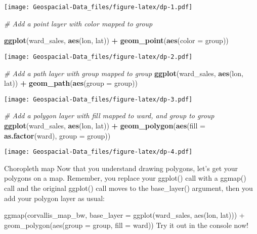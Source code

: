 \documentclass[]{article}
\newenvironment{Shaded}{\begin{snugshade}}{\end{snugshade}}
\newcommand{\CommentTok}[1]{\textcolor[rgb]{0.56,0.35,0.01}{\textit{#1}}}
\newcommand{\DataTypeTok}[1]{\textcolor[rgb]{0.13,0.29,0.53}{#1}}
\newcommand{\KeywordTok}[1]{\textcolor[rgb]{0.13,0.29,0.53}{\textbf{#1}}}
\newcommand{\NormalTok}[1]{#1}
\newcommand{\OperatorTok}[1]{\textcolor[rgb]{0.81,0.36,0.00}{\textbf{#1}}}
\begin{document}
\texttt{[image: Geospacial-Data\_files/figure-latex/dp-1.pdf]}

\begin{Shaded}
\begin{Highlighting}[]
\CommentTok{# Add a point layer with color mapped to group}

\KeywordTok{ggplot}\NormalTok{(ward_sales, }\KeywordTok{aes}\NormalTok{(lon, lat)) }\OperatorTok{+}
\KeywordTok{geom_point}\NormalTok{(}\KeywordTok{aes}\NormalTok{(}\DataTypeTok{color =}\NormalTok{ group))}
\end{Highlighting}
\end{Shaded}

\texttt{[image: Geospacial-Data\_files/figure-latex/dp-2.pdf]}

\begin{Shaded}
\begin{Highlighting}[]
\CommentTok{# Add a path layer with group mapped to group}
\KeywordTok{ggplot}\NormalTok{(ward_sales, }\KeywordTok{aes}\NormalTok{(lon, lat)) }\OperatorTok{+}
\KeywordTok{geom_path}\NormalTok{(}\KeywordTok{aes}\NormalTok{(}\DataTypeTok{group =}\NormalTok{ group))}
\end{Highlighting}
\end{Shaded}

\texttt{[image: Geospacial-Data\_files/figure-latex/dp-3.pdf]}

\begin{Shaded}
\begin{Highlighting}[]
\CommentTok{# Add a polygon layer with fill mapped to ward, and group to group}
\KeywordTok{ggplot}\NormalTok{(ward_sales, }\KeywordTok{aes}\NormalTok{(lon, lat)) }\OperatorTok{+}
\KeywordTok{geom_polygon}\NormalTok{(}\KeywordTok{aes}\NormalTok{(}\DataTypeTok{fill =} \KeywordTok{as.factor}\NormalTok{(ward), }\DataTypeTok{group =}\NormalTok{ group))}
\end{Highlighting}
\end{Shaded}

\texttt{[image: Geospacial-Data\_files/figure-latex/dp-4.pdf]}

Choropleth map Now that you understand drawing polygons, let's get your
polygons on a map. Remember, you replace your ggplot() call with a
ggmap() call and the original ggplot() call moves to the base\_layer()
argument, then you add your polygon layer as usual:

ggmap(corvallis\_map\_bw, base\_layer = ggplot(ward\_sales, aes(lon,
lat))) + geom\_polygon(aes(group = group, fill = ward)) Try it out in
the console now!
\end{document}
